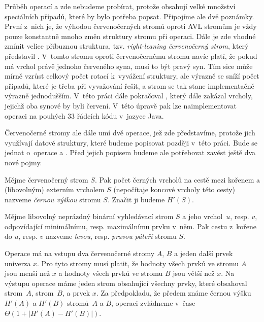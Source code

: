 Průběh operací  a  zde nebudeme probírat, protože obsahují velké
množství speciálních případů, které by bylo potřeba popsat. Připojíme ale
dvě poznámky. První z~nich je, že výhodou červenočerných stromů oproti AVL
stromům je vždy pouze konstantně mnoho změn struktury stromu při operaci. Dále je zde
vhodné zmínit velice příbuznou struktura, tzv.
\emph{right-leaning červenočerný strom}, který představil \citet{rightleaning}.
V~tomto stromu oproti červenočernému stromu navíc platí, že pokud má vrchol právě jednoho červeného syna,
musí to být pravý syn. Tím sice může mírně vzrůst celkový počet rotací
k~vyvážení struktury, ale výrazně se sníží počet případů, které je třeba při
vyvažování řešit, a strom se tak stane implementačně výrazně jednodušším. V~této
práci dále pokračoval \citet{leftleaning}, který dále zakázal vrcholy, jejichž
oba synové by byli červení. V~této úpravě pak lze naimplementovat operaci
 na pouhých 33 řádcích kódu v~jazyce Java.    

Červenočerné stromy ale dále umí dvě operace, jež zde představíme, protože
jich využívají datové struktury, které budeme popisovat později v~této práci. Bude se jednat o~operace \emph{} a \emph{}.
Před jejich popisem budeme ale potřebovat zavést ještě dva nové pojmy.

\begin{definice}
Mějme červenočerný strom $S$. Pak počet černých vrcholů na cestě mezi kořenem a (libovolným) externím vrcholem $S$ (nepočítaje koncové vrcholy této cesty) nazveme \emph{černou výškou} stromu $S$. Značit ji budeme $H'(S)$.
\end{definice}


\begin{definice}
Mějme libovolný neprázdný binární vyhledávací strom $S$ a jeho vrchol~$u$, resp. $v$, odpovídající minimálnímu, resp. maximálnímu prvku v~něm. Pak cestu z~kořene do $u$, resp. $v$ nazveme \emph{levou}, resp. \emph{pravou páteří} stromu $S$.
\end{definice}

Operace  má na vstupu dva červenočerné
stromy $A$, $B$ a jeden další prvek univerza $x$. Pro tyto stromy musí platit,
že hodnoty všech prvků ve stromu $A$ jsou menší než $x$ a hodnoty všech prvků
ve stromu $B$ jsou větší než $x$. Na výstupu operace  máme jeden strom
obsahující všechny prvky, které obsahoval strom~$A$, strom~$B$, a prvek $x$. Za
předpokladu, že předem známe černou výšku $H'(A)$ a $H'(B)$ stromů~$A$
a $B$, operaci  zvládneme v~čase $\Theta(1+|H'(A) -
H'(B)|)$.

